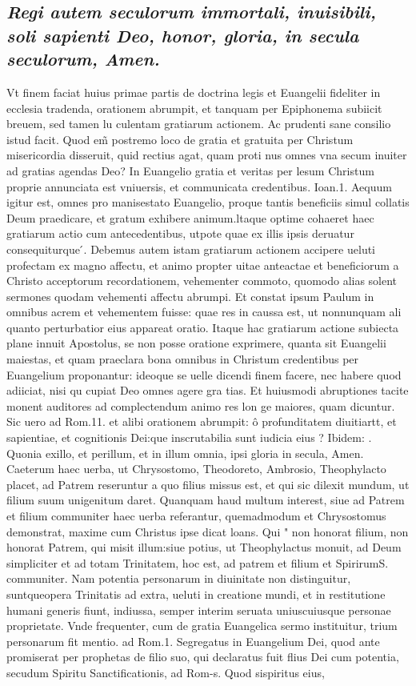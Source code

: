 \documentclass{article}
\begin{document}
\begin{pages}
\subsection*{\textit{Regi autem seculorum immortali, inuisibili, soli sapienti Deo, honor, gloria, in secula seculorum, Amen. }}\pstart Vt finem faciat huius primae partis de doctrina legis et Euangelii fideliter in ecclesia tradenda, orationem abrumpit, et tanquam per Epiphonema subiicit breuem, sed tamen lu culentam gratiarum actionem. Ac prudenti sane consilio istud facit. Quod em̃ postremo loco de gratia et gratuita per Christum misericordia disseruit, quid rectius agat, quam proti nus omnes vna secum inuiter ad gratias agendas Deo? In Euangelio gratia et veritas per lesum Christum proprie annunciata est vniuersis, et communicata credentibus. Ioan.1. Aequum igitur est, omnes pro manisestato Euangelio, proque  tantis beneficiis simul collatis Deum praedicare, et gratum exhibere animum.ltaque  optime cohaeret haec gratiarum actio cum antecedentibus, utpote quae ex illis ipsis deruatur consequiturque ́. Debemus autem istam gratiarum actionem accipere ueluti profectam ex magno affectu, et animo propter uitae anteactae et beneficiorum a Christo acceptorum recordationem, vehementer commoto, quomodo alias solent sermones quodam vehementi affectu abrumpi. Et constat ipsum Paulum in omnibus acrem et vehementem fuisse: quae res in caussa est, ut nonnunquam ali quanto perturbatior eius appareat oratio. Itaque  hac gratiarum actione subiecta plane innuit Apostolus, se non posse oratione exprimere, quanta sit Euangelii maiestas, et quam praeclara bona omnibus in Christum credentibus per Euangelium proponantur: ideoque  se uelle dicendi finem facere, nec habere quod adiiciat, nisi qu cupiat Deo omnes agere gra tias. Et huiusmodi abruptiones tacite monent auditores ad complectendum animo res lon ge maiores, quam dicuntur. Sic uero ad Rom.11. et alibi orationem abrumpit: ô profunditatem diuitiartt, et sapientiae, et cognitionis Dei:que  inscrutabilia sunt iudicia eius ? Ibidem: .  Quonia exillo, et perillum, et in illum omnia, ipsi gloria in secula, Amen. Caeterum haec uerba, ut Chrysostomo, Theodoreto, Ambrosio, Theophylacto placet, ad Patrem reseruntur a quo filius missus est, et qui sic dilexit mundum, ut filium suum unigenitum daret. Quanquam haud multum interest, siue ad Patrem et filium communiter haec uerba referantur, quemadmodum et Chrysostomus demonstrat, maxime cum Christus ipse dicat loans. Qui " non honorat filium, non honorat Patrem, qui misit illum:siue potius, ut Theophylactus monuit, ad Deum simpliciter et ad totam Trinitatem, hoc est, ad patrem et filium et SpirirumS. communiter. Nam potentia personarum in diuinitate non distinguitur, suntqueopera Trinitatis ad extra, ueluti in creatione mundi, et in restitutione humani generis fiunt, indiussa, semper interim seruata uniuscuiusque  personae proprietate. Vnde frequenter, cum de gratia Euangelica sermo instituitur, trium personarum fit mentio. ad Rom.1. Segregatus in Euangelium Dei, quod ante promiserat per prophetas de filio suo, qui declaratus fuit flius Dei cum potentia, secudum Spiritu Sanctificationis, ad Rom-s. Quod sispiritus eius,  \pend

\end{pages}
\end{document}
